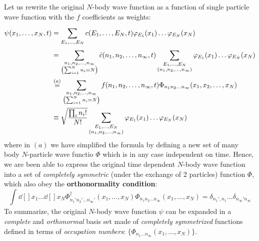 \documentclass[../main/main.tex]{subfiles}
\begin{document}
Let us rewrite the original \( N \)-body wave function as a function of single particle wave function with the \( f \) coefficients as weights:  
\begin{equation*}
\begin{split}
  \psi (x_1, \dots, x_N, t) &= \sum_{E_1, \dots, E_N}^{} c(E_1, \dots, E_N,t) \varphi _{E_1}(x_1) \dots \varphi _{E_N}(x_N)  \\
  &=   \sum_{\substack{n_1,n_2, \dots,n_ \infty  \\ \qty(\sum_{i=1}^{N} n_i = N ) } }^{} \bar{c} (n_1,n_2,\dots,n_ \infty ,t) \sum_{\substack{E_1, \dots, E_N \\ (n_1, n_2, \dots, n_ \infty )} }^{} \varphi _{E_1}(x_1) \dots \varphi _{E_N}(x_N) \\
  & \overset{(a)}{=}   \sum_{\substack{n_1,n_2, \dots,n_ \infty  \\ \qty(\sum_{i=1}^{N} n_i = N ) } }^{} f(n_1,n_2, \dots, n_ \infty ,t) \Phi _{n_1 n_2 \dots n_ \infty } (x_1, x_2, \dots, x_N) \\
  & \equiv \sqrt{\frac{\prod_{i}^{} n_i!  }{N!}}  \sum_{\substack{E_1, \dots, E_N \\ (n_1, n_2, \dots, n_ \infty )} }^{} \varphi _{E_1}(x_1) \dots \varphi _{E_N}(x_N)
\end{split}
\end{equation*}
where in \( (a) \) we have simplified the formula by defining a new set of many body \( N \)-particle wave functio \( \Phi  \) which is in any case independent on time. Hence, we are been able to express the original time dependent \( N \)-body wave function into a set of \emph{completely  symmetric}  (under the exchange of 2 particles)  function \( \Phi  \), which also obey the \textbf{orthonormality condition}:
\begin{equation*}
  \int_{}^{} \dd[]{x_1}\dots \dd[]{x_N} \Phi^\dag _{n_1' n_2' \dots n_ \infty'} (x_1, \dots, x_N) \Phi_{n_1 n_2 \dots n_ \infty} (x_1, \dots, x_N)  = \delta_{n_1', n_1} \dots \delta_{n_ \infty ' n_ \infty }
\end{equation*}
To summarize, the original \( N \)-body wave function \( \psi  \) can be expanded in a \emph{complete} and \emph{orthonormal} basis set made of \emph{completely symmetrized} functions defined in terms of \emph{occupation numbers}: \( \{ \Phi _{n_1 \dots n_ \infty } (x_1, \dots, x_N)\}   \).
\end{document}
